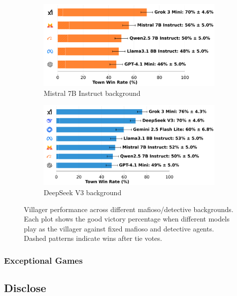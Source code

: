 \documentclass{article}
\begin{document}
\begin{figure}[htbp]
    \begin{subfigure}[b]{0.48\textwidth}
        \centering
        \includegraphics[width=\textwidth]{../results/villager_mistral_7b_instruct_v4_1_benchmark.png}
        \caption{Mistral 7B Instruct background}
        \label{fig:villager_mistral}
    \end{subfigure}
    \hfill
    \begin{subfigure}[b]{0.48\textwidth}
        \centering
        \includegraphics[width=\textwidth]{../results/villager_deepseek_v3_v4_1_benchmark.png}
        \caption{DeepSeek V3 background}
        \label{fig:villager_deepseek}
    \end{subfigure}
    \caption{Villager performance across different mafioso/detective backgrounds. Each plot shows the good victory percentage when different models play as the villager against fixed mafioso and detective agents. Dashed patterns indicate wins after tie votes.}
    \label{fig:detect_results}
\end{figure}


\subsubsection{Exceptional Games}


\subsection{Disclose}
\end{document}
